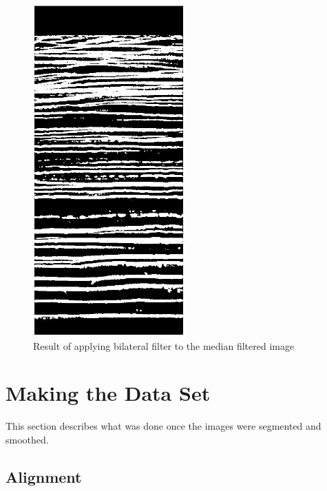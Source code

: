 \documentclass[11pt,psfig]{article}
\begin{document}
\begin{figure}[H]
\centering
\includegraphics[height=5in]{image1_bilateralFilterResult.jpg}
\caption{Result of applying bilateral filter to the median filtered image}
\end{figure}

\section{Making the Data Set}

This section describes what was done once the images were segmented and smoothed. 

\subsection{Alignment}
\end{document}

